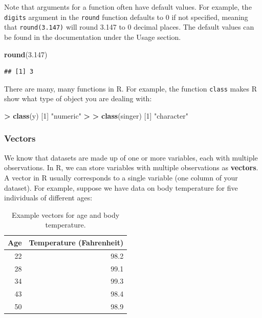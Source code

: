 \documentclass[
]{book}
\newenvironment{Shaded}{\begin{snugshade}}{\end{snugshade}}
\newcommand{\DecValTok}[1]{\textcolor[rgb]{0.00,0.00,0.81}{#1}}
\newcommand{\ErrorTok}[1]{\textcolor[rgb]{0.64,0.00,0.00}{\textbf{#1}}}
\newcommand{\FloatTok}[1]{\textcolor[rgb]{0.00,0.00,0.81}{#1}}
\newcommand{\FunctionTok}[1]{\textcolor[rgb]{0.13,0.29,0.53}{\textbf{#1}}}
\newcommand{\NormalTok}[1]{#1}
\newcommand{\SpecialCharTok}[1]{\textcolor[rgb]{0.81,0.36,0.00}{\textbf{#1}}}
\newcommand{\StringTok}[1]{\textcolor[rgb]{0.31,0.60,0.02}{#1}}
\begin{document}
Note that arguments for a function often have default values. For example, the \texttt{digits} argument in the \texttt{round} function defaults to 0 if not specified, meaning that \texttt{round(3.147)} will round 3.147 to 0 decimal places. The default values can be found in the documentation under the Usage section.

\begin{Shaded}
\begin{Highlighting}[]
\FunctionTok{round}\NormalTok{(}\FloatTok{3.147}\NormalTok{)}
\end{Highlighting}
\end{Shaded}

\begin{verbatim}
## [1] 3
\end{verbatim}

There are many, many functions in R. For example, the function \texttt{class} makes R show what type of object you are dealing with:

\begin{Shaded}
\begin{Highlighting}[]
\SpecialCharTok{\textgreater{}} \FunctionTok{class}\NormalTok{(y)}
\NormalTok{[}\DecValTok{1}\NormalTok{] }\StringTok{"numeric"}
\SpecialCharTok{\textgreater{}} 
\ErrorTok{\textgreater{}} \FunctionTok{class}\NormalTok{(singer)}
\NormalTok{[}\DecValTok{1}\NormalTok{] }\StringTok{"character"}
\end{Highlighting}
\end{Shaded}

\subsubsection{Vectors}\label{vectors}

We know that datasets are made up of one or more variables, each with multiple observations. In R, we can store variables with multiple observations as \textbf{vectors}. A vector in R usually corresponds to a single variable (one column of your dataset). For example, suppose we have data on body temperature for five individuals of different ages:

\begin{table}[!h]
\centering
\caption{\label{tab:c03c36}\label{tab:c03c36} Example vectors for age and body temperature.}
\centering
\begin{tabular}[t]{rr}
\toprule
Age & Temperature (Fahrenheit)\\
\midrule
22 & 98.2\\
28 & 99.1\\
34 & 99.3\\
43 & 98.4\\
50 & 98.9\\
\bottomrule
\end{tabular}
\end{table}
\end{document}
